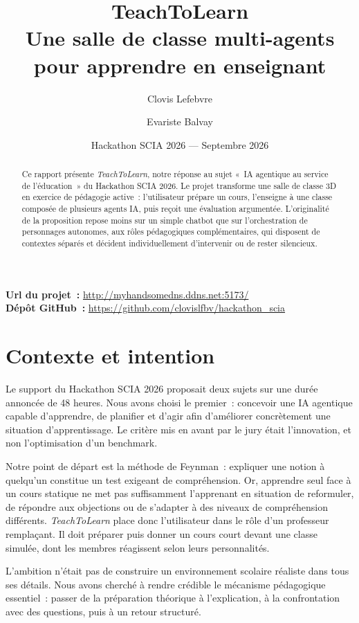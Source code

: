 \documentclass[11pt,a4paper]{article}
\title{\textbf{TeachToLearn}\\[0.35em]\large Une salle de classe multi-agents pour apprendre en enseignant}
\author{Clovis Lefebvre \and Evariste Balvay}
\date{Hackathon SCIA 2026 --- Septembre 2026}
\begin{document}
\maketitle

\begin{center}
\textbf{Url du projet~:} \url{http://myhandsomedns.ddns.net:5173/}
\\[0.3em]
\textbf{Dépôt GitHub~:} \url{https://github.com/clovislfbv/hackathon_scia}
\end{center}

\begin{abstract}
Ce rapport présente \textit{TeachToLearn}, notre réponse au sujet «~IA agentique au service de l'éducation~» du Hackathon SCIA 2026. Le projet transforme une salle de classe 3D en exercice de pédagogie active~: l'utilisateur prépare un cours, l'enseigne à une classe composée de plusieurs agents IA, puis reçoit une évaluation argumentée. L'originalité de la proposition repose moins sur un simple chatbot que sur l'orchestration de personnages autonomes, aux rôles pédagogiques complémentaires, qui disposent de contextes séparés et décident individuellement d'intervenir ou de rester silencieux.
\end{abstract}

\tableofcontents
\newpage

\section{Contexte et intention}

Le support du Hackathon SCIA 2026 proposait deux sujets sur une durée annoncée de 48 heures. Nous avons choisi le premier~: concevoir une IA agentique capable d'apprendre, de planifier et d'agir afin d'améliorer concrètement une situation d'apprentissage. Le critère mis en avant par le jury était l'innovation, et non l'optimisation d'un benchmark.

Notre point de départ est la méthode de Feynman~: expliquer une notion à quelqu'un constitue un test exigeant de compréhension. Or, apprendre seul face à un cours statique ne met pas suffisamment l'apprenant en situation de reformuler, de répondre aux objections ou de s'adapter à des niveaux de compréhension différents. \textit{TeachToLearn} place donc l'utilisateur dans le rôle d'un professeur remplaçant. Il doit préparer puis donner un cours court devant une classe simulée, dont les membres réagissent selon leurs personnalités.

L'ambition n'était pas de construire un environnement scolaire réaliste dans tous ses détails. Nous avons cherché à rendre crédible le mécanisme pédagogique essentiel~: passer de la préparation théorique à l'explication, à la confrontation avec des questions, puis à un retour structuré.
\end{document}
